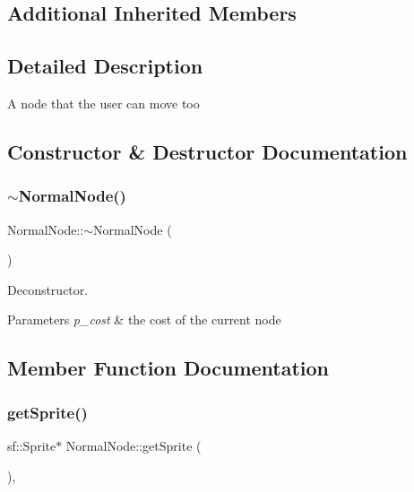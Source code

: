 \subsection*{Additional Inherited Members}


\subsection{Detailed Description}
A node that the user can move too 

\subsection{Constructor \& Destructor Documentation}
\mbox{\label{class_normal_node_a0a046b69544c8cc7e352dca9b5837b76}} 
\subsubsection{\texorpdfstring{$\sim$\+Normal\+Node()}{~NormalNode()}}
{\footnotesize\ttfamily Normal\+Node\+::$\sim$\+Normal\+Node (\begin{DoxyParamCaption}{ }\end{DoxyParamCaption})}



Deconstructor. 


\begin{DoxyParams}{Parameters}
{\em p\+\_\+cost} & the cost of the current node \\
\hline
\end{DoxyParams}


\subsection{Member Function Documentation}
\mbox{\label{class_normal_node_aa5b5cb046635230adf5356e8bd0a61c2}} 
\subsubsection{\texorpdfstring{get\+Sprite()}{getSprite()}}
{\footnotesize\ttfamily sf\+::\+Sprite$\ast$ Normal\+Node\+::get\+Sprite (\begin{DoxyParamCaption}{ }\end{DoxyParamCaption})\hspace{0.3cm}{\ttfamily [override]}, {\ttfamily [virtual]}}




